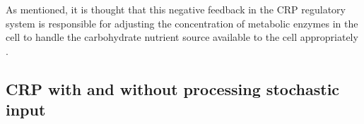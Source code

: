 %
As mentioned, 
it is thought that this negative feedback in the CRP regulatory system
is responsible for adjusting the concentration of metabolic enzymes in the cell to handle the carbohydrate nutrient source available to the cell appropriately \cite{Towbin2017}.
%


\subsection*{CRP with and without processing stochastic input}

